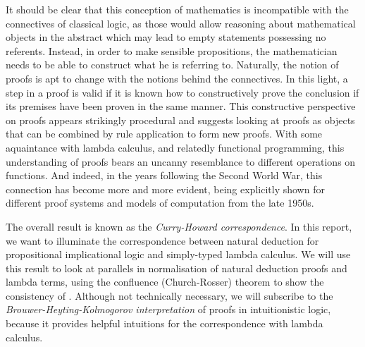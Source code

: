 It should be clear that this conception of mathematics is incompatible with the
connectives of classical logic, as those would allow reasoning about
mathematical objects in the abstract which may lead to empty statements
possessing no referents. Instead, in order to make sensible propositions, the
mathematician needs to be able to construct what he is referring to. Naturally,
the notion of proofs is apt to change with the notions behind the connectives.
In this light, a step in a proof is valid if it is known how to constructively
prove the conclusion if its premises have been proven in the same manner. This
constructive perspective on proofs appears strikingly procedural and suggests
looking at proofs as objects that can be combined by rule application to form
new proofs. With some aquaintance with lambda calculus, and relatedly functional
programming, this understanding of proofs bears an uncanny resemblance to
different operations on functions. And indeed, in the years following the Second
World War, this connection has become more and more evident, being explicitly
shown for different proof systems and models of computation from the late 1950s.

The overall result is known as the \textit{Curry-Howard correspondence}. In this
report, we want to illuminate the correspondence between natural deduction for
propositional implicational logic and simply-typed lambda calculus. We will use
this result to look at parallels in normalisation of natural deduction proofs
and lambda terms, using the confluence (Church-Rosser) theorem to show the
consistency of \implnpi. Although not technically necessary, we will subscribe
to the \textit{Brouwer-Heyting-Kolmogorov interpretation} of proofs in
intuitionistic logic, because it provides helpful intuitions for the
correspondence with lambda calculus.
